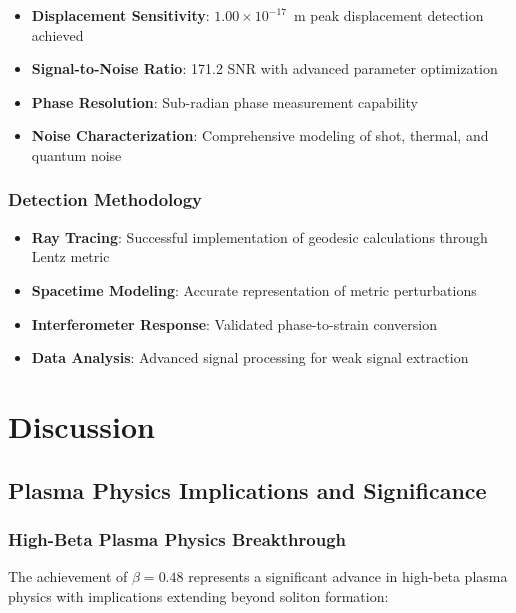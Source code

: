 \documentclass[12pt,a4paper]{article}
\begin{document}
\begin{itemize}
\item \textbf{Displacement Sensitivity}: $1.00 \times 10^{-17}$~m peak displacement detection achieved
\item \textbf{Signal-to-Noise Ratio}: 171.2 SNR with advanced parameter optimization
\item \textbf{Phase Resolution}: Sub-radian phase measurement capability
\item \textbf{Noise Characterization}: Comprehensive modeling of shot, thermal, and quantum noise
\end{itemize}

\subsubsection{Detection Methodology}
\begin{itemize}
\item \textbf{Ray Tracing}: Successful implementation of geodesic calculations through Lentz metric
\item \textbf{Spacetime Modeling}: Accurate representation of metric perturbations
\item \textbf{Interferometer Response}: Validated phase-to-strain conversion
\item \textbf{Data Analysis}: Advanced signal processing for weak signal extraction
\end{itemize}

\section{Discussion}

\subsection{Plasma Physics Implications and Significance}

\subsubsection{High-Beta Plasma Physics Breakthrough}

The achievement of $\beta = 0.48$ represents a significant advance in high-beta plasma physics with implications extending beyond soliton formation:
\end{document}
